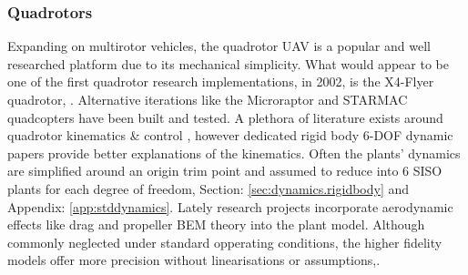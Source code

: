 \subsubsection*{Quadrotors}
Expanding on multirotor vehicles, the quadrotor UAV is a popular and well researched platform due to its mechanical simplicity. What would appear to be one of the first quadrotor research implementations, in 2002, is the X4-Flyer quadrotor, \cite{x4flyer,x4flyercontrol}. Alternative iterations like the Microraptor\cite{microraptor} and STARMAC\cite{starmac} quadcopters have been built and tested. A plethora of literature exists around quadrotor kinematics \& control \cite{dynamicmodelling2013, dynamicmodelling2009, modelingquadcopter, quaddynamics, fullquadcoptercontrol}, however dedicated rigid body 6-DOF dynamic papers \cite{rigidbodylecture,eulerrigidbody} provide better explanations of the kinematics. Often the plants' dynamics are simplified around an origin trim point and assumed to reduce into 6 SISO plants for each degree of freedom, Section: \ref{sec:dynamics.rigidbody} and Appendix: \ref{app:stddynamics}. Lately research projects incorporate aerodynamic effects like drag and propeller BEM theory into the plant model\cite{lowreynolds,bem,starmac}. Although commonly neglected under standard opperating conditions, the higher fidelity models offer more precision without linearisations or assumptions,\cite{nonlineardynamics,starmac}.
\par
